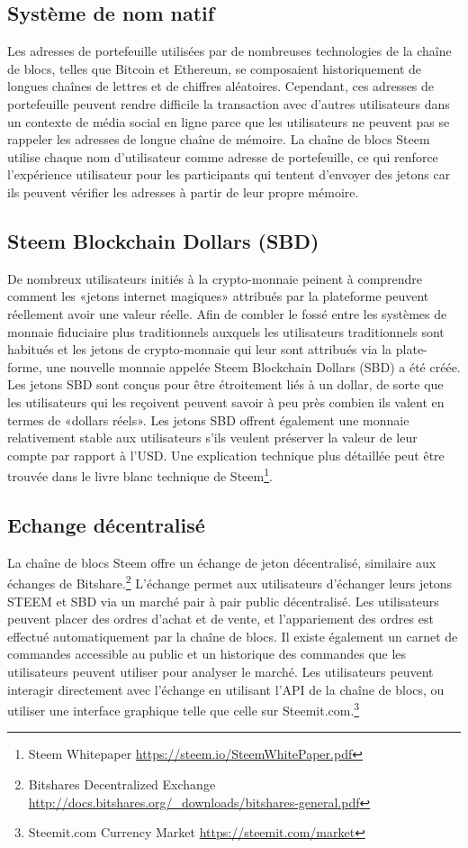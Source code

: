 \documentclass[11pt]{article}
\begin{document}
\subsection{Système de nom natif}
\label{sec:org9c571df}
Les adresses de portefeuille utilisées par de nombreuses
technologies de la chaîne de blocs, telles que Bitcoin et Ethereum, se
composaient historiquement de longues chaînes de lettres et de
chiffres aléatoires. Cependant, ces adresses de portefeuille
peuvent rendre difficile la transaction avec d'autres utilisateurs
dans un contexte de média social en ligne parce que les
utilisateurs ne peuvent pas se rappeler les adresses de longue chaîne
de mémoire. La chaîne de blocs Steem utilise chaque nom
d'utilisateur comme adresse de portefeuille, ce qui renforce
l'expérience utilisateur pour les participants qui tentent
d'envoyer des jetons car ils peuvent vérifier les adresses à partir
de leur propre mémoire. 
\subsection{Steem Blockchain Dollars (SBD)}
\label{sec:orge2b05e1}
De nombreux utilisateurs initiés à la crypto-monnaie peinent à
comprendre comment les «jetons internet magiques» attribués par la
plateforme peuvent réellement avoir une valeur réelle. Afin de
combler le fossé entre les systèmes de monnaie fiduciaire plus
traditionnels auxquels les utilisateurs traditionnels sont habitués
et les jetons de crypto-monnaie qui leur sont attribués via la
plate-forme, une nouvelle monnaie appelée Steem Blockchain Dollars
(SBD) a été créée. Les jetons SBD sont conçus pour être étroitement
liés à un dollar, de sorte que les utilisateurs qui les reçoivent
peuvent savoir à peu près combien ils valent en termes de «dollars
réels». Les jetons SBD offrent également une monnaie relativement
stable aux utilisateurs s'ils veulent préserver la valeur de leur
compte par rapport à l'USD. Une explication technique plus
détaillée peut être trouvée dans le livre blanc technique de
Steem\footnote{Steem Whitepaper \url{https://steem.io/SteemWhitePaper.pdf}}.
\subsection{Echange décentralisé}
\label{sec:org6d94add}
La chaîne de blocs Steem offre un échange de jeton décentralisé,
similaire aux échanges de Bitshare.\footnote{Bitshares Decentralized Exchange \url{http://docs.bitshares.org/\_downloads/bitshares-general.pdf}} L'échange permet aux
utilisateurs d'échanger leurs jetons STEEM et SBD via un marché
pair à pair public décentralisé. Les utilisateurs peuvent placer
des ordres d'achat et de vente, et l'appariement des ordres est
effectué automatiquement par la chaîne de blocs. Il existe
également un carnet de commandes accessible au public et un
historique des commandes que les utilisateurs peuvent utiliser pour
analyser le marché. Les utilisateurs peuvent interagir directement
avec l'échange en utilisant l'API de la chaîne de blocs, ou utiliser une
interface graphique telle que celle sur Steemit.com.\footnote{Steemit.com Currency Market \url{https://steemit.com/market}} 
\end{document}
